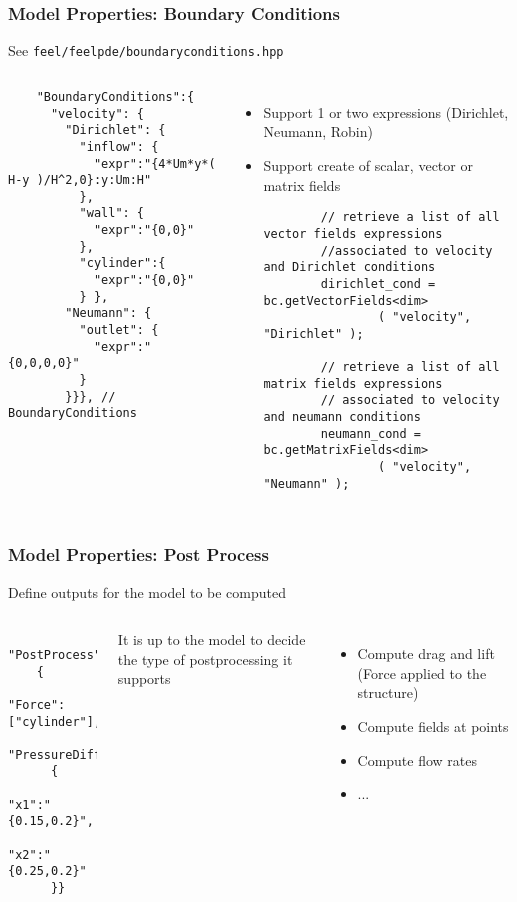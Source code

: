 \begin{frame}[fragile]
  \frametitle{Model Properties: Boundary Conditions}
  See \texttt{feel/feelpde/boundaryconditions.hpp}
\begin{columns}[c]
  \begin{verbatim}
    "BoundaryConditions":{
      "velocity": {
        "Dirichlet": {
          "inflow": {
            "expr":"{4*Um*y*( H-y )/H^2,0}:y:Um:H"
          },
          "wall": {
            "expr":"{0,0}"
          },
          "cylinder":{
            "expr":"{0,0}"
          } },
        "Neumann": {
          "outlet": {
            "expr":"{0,0,0,0}"
          }
        }}}, // BoundaryConditions
  \end{verbatim}
    \begin{itemize}
    \item Support 1 or two expressions (Dirichlet, Neumann, Robin)
    \item Support create of scalar, vector or matrix fields
      \begin{verbatim}
        // retrieve a list of all vector fields expressions
        //associated to velocity and Dirichlet conditions
        dirichlet_cond = bc.getVectorFields<dim>
                ( "velocity", "Dirichlet" );

        // retrieve a list of all matrix fields expressions
        // associated to velocity and neumann conditions
        neumann_cond = bc.getMatrixFields<dim>
                ( "velocity", "Neumann" );
      \end{verbatim}
    \end{itemize}
  \end{columns}
\end{frame}

\begin{frame}[fragile]
  \frametitle{Model Properties: Post Process}
  Define outputs for the model to be computed
\begin{columns}[c]
  \begin{verbatim}
    "PostProcess":
    {
      "Force":["cylinder"],
      "PressureDifference":
      {
        "x1":"{0.15,0.2}",
        "x2":"{0.25,0.2}"
      }}
  \end{verbatim}
It is up to the model to decide the type of postprocessing it supports
\begin{itemize}
\item Compute drag and lift (Force applied to the structure)
\item Compute fields at points
\item Compute flow rates
\item ...
\end{itemize}
  \end{columns}
\end{frame}

